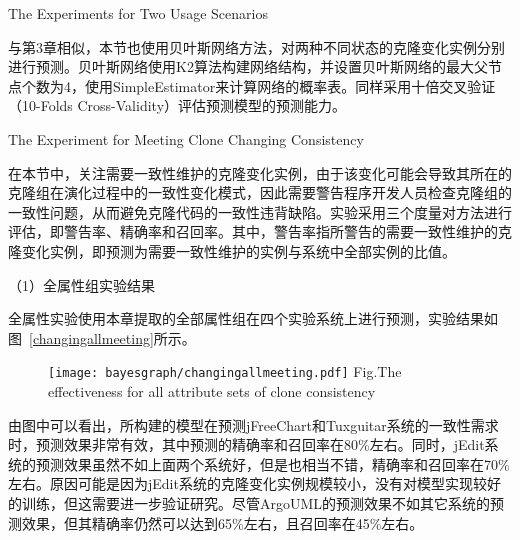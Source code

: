 {The Experiments for Two Usage Scenarios}

与第3章相似，本节也使用贝叶斯网络方法，对两种不同状态的克隆变化实例分别进行预测。贝叶斯网络使用K2算法构建网络结构，并设置贝叶斯网络的最大父节点个数为4，使用SimpleEstimator来计算网络的概率表。同样采用十倍交叉验证（10-Folds Cross-Validity）评估预测模型的预测能力。

{The Experiment for Meeting Clone Changing Consistency}

在本节中，关注需要一致性维护的克隆变化实例，由于该变化可能会导致其所在的克隆组在演化过程中的一致性变化模式，因此需要警告程序开发人员检查克隆组的一致性问题，从而避免克隆代码的一致性违背缺陷。实验采用三个度量对方法进行评估，即警告率、精确率和召回率。其中，警告率指所警告的需要一致性维护的克隆变化实例，即预测为需要一致性维护的实例与系统中全部实例的比值。


（1）全属性组实验结果

全属性实验使用本章提取的全部属性组在四个实验系统上进行预测，实验结果如图~\ref{changingallmeeting}所示。

\begin{figure}[h]
\centering
\texttt{[image: bayesgraph/changingallmeeting.pdf]}
{Fig.$\!$}{The effectiveness for all attribute sets of clone consistency}
\vspace{-1em}
\end{figure}

由图中可以看出，所构建的模型在预测jFreeChart和Tuxguitar系统的一致性需求时，预测效果非常有效，其中预测的精确率和召回率在80\%左右。同时，jEdit系统的预测效果虽然不如上面两个系统好，但是也相当不错，精确率和召回率在70\%左右。原因可能是因为jEdit系统的克隆变化实例规模较小，没有对模型实现较好的训练，但这需要进一步验证研究。尽管ArgoUML的预测效果不如其它系统的预测效果，但其精确率仍然可以达到65\%左右，且召回率在45\%左右。

